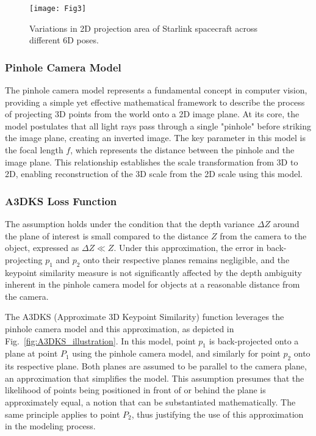 \documentclass[a4paper,fleqn]{cas-sc}
\begin{document}
\begin{figure}[!htbp]
	\centering
	\texttt{[image: Fig3]} 
	\caption{Variations in 2D projection area of Starlink spacecraft across different 6D poses.}
	\label{fig:Obj_Proj1}
\end{figure}

\subsubsection{Pinhole Camera Model}
The pinhole camera model represents a fundamental concept in computer vision, providing a simple yet effective mathematical framework to describe the process of projecting 3D points from the world onto a 2D image plane. At its core, the model postulates that all light rays pass through a single "pinhole" before striking the image plane, creating an inverted image. The key parameter in this model is the focal length $f$, which represents the distance between the pinhole and the image plane. This relationship establishes the scale transformation from 3D to 2D, enabling reconstruction of the 3D scale from the 2D scale using this model.

\subsubsection{A3DKS Loss Function}
The assumption holds under the condition that the depth variance $\Delta Z$ around the plane of interest is small compared to the distance $Z$ from the camera to the object, expressed as $\Delta Z \ll Z$. Under this approximation, the error in back-projecting $p_1$ and $p_2$ onto their respective planes remains negligible, and the keypoint similarity measure is not significantly affected by the depth ambiguity inherent in the pinhole camera model for objects at a reasonable distance from the camera.

The A3DKS (Approximate 3D Keypoint Similarity) function leverages the pinhole camera model and this approximation, as depicted in Fig.~\ref{fig:A3DKS_illustration}. In this model, point $p_1$ is back-projected onto a plane at point $P_1$ using the pinhole camera model, and similarly for point $p_2$ onto its respective plane. Both planes are assumed to be parallel to the camera plane, an approximation that simplifies the model. This assumption presumes that the likelihood of points being positioned in front of or behind the plane is approximately equal, a notion that can be substantiated mathematically. The same principle applies to point $P_2$, thus justifying the use of this approximation in the modeling process.
\end{document}
